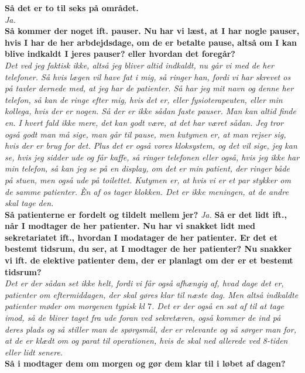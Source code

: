 \textbf{Så det er to til seks på området.}\\
\noindent
\textit{Ja.}\\
\noindent
\textbf{Så kommer der noget ift. pauser. Nu har vi læst, at I har nogle pauser, hvis I har de her arbdejdsdage, om de er betalte pause, altså om I kan blive indkaldt I jeres pauser? eller hvordan det foregår?}\\
\noindent
\textit{Det ved jeg faktisk ikke, altså jeg bliver altid indkaldt, nu går vi med de her telefoner.  Så hvis lægen vil have fat i mig, så ringer han, fordi vi har skrevet os på tavler dernede med, at jeg har de patienter. Så har jeg mit navn og denne her telefon, så kan de ringe efter mig, hvis det er, eller fysioterapeuten, eller min kollega, hvis der er nogen. Så der er ikke sådan faste pauser. Man kan altid finde en. I hvert fald ikke mere, det kan godt være, at det har været sådan. Jeg tror også godt man må sige, man går til pause, men kutymen er, at man rejser sig, hvis der er brug for det. Plus det er også vores kloksystem, og det vil sige, jeg kan se, hvis jeg sidder ude og får kaffe, så ringer telefonen eller også, hvis jeg ikke har min telefon, så kan jeg se på en display, om det er min patient, der ringer både på stuen, men også ude på toilettet. Kutymen er, at hvis vi er et par stykker om de samme patienter. Èn af os tager klokken. Det er ikke meningen, at de andre skal tage den.}\\
\noindent
\textbf{Så patienterne er fordelt og tildelt mellem jer?}
\noindent
\textit{Ja.}
\noindent
\textbf{Så er det lidt ift., når I modtager de her patienter. Nu har vi snakket lidt med sekretariatet ift., hvordan I modatager de her patienter. Er det et bestemt tidsrum, du ser, at I modtager de her patienter? Nu snakker vi ift. de elektive patienter dem, der er planlagt om der er et bestemt tidsrum?}\\
\noindent
\textit{Det er der sådan set ikke helt, fordi vi får også afhængig af, hvad dage det er, patienter om eftermiddagen, der skal gøres klar til næste dag. Men altså indkaldte patienter møder om morgenen typisk kl $7$. Det er der også en sat af til at tage imod, så de bliver taget fra ude foran ved sekretæren, også kommer de ind på deres plads og så stiller man de spørgsmål, der er relevante og så sørger man for, at de er klædt om og parat til operationen, hvis de skal ned allerede ved 8-tiden eller lidt senere.}\\
\noindent
\textbf{Så i modtager dem om morgen og gør dem klar til i løbet af dagen?}\\

